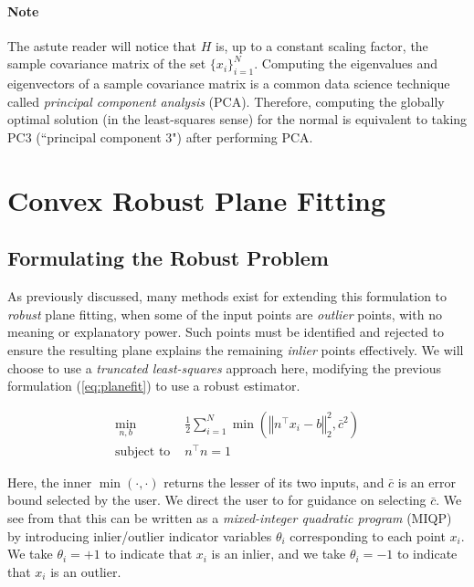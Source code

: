 \documentclass[conference]{IEEEtran}
\begin{document}
\paragraph*{Note} The astute reader will notice that \( H \) is, up to a constant scaling factor, the sample covariance matrix of the set \( \{ x_i \}_{i=1}^N \).  Computing the eigenvalues and eigenvectors of a sample covariance matrix is a common data science technique called \textit{principal component analysis} (PCA).  Therefore, computing the globally optimal solution (in the least-squares sense) for the normal is equivalent to taking PC3 (``principal component 3") after performing PCA.

\section{Convex Robust Plane Fitting}

\subsection{Formulating the Robust Problem}

As previously discussed, many methods exist for extending this formulation to \textit{robust} plane fitting, when some of the input points are \textit{outlier} points, with no meaning or explanatory power.  Such points must be identified and rejected to ensure the resulting plane explains the remaining \textit{inlier} points effectively.  We will choose to use a \textit{truncated least-squares} approach here, modifying the previous formulation (\ref{eq:planefit}) to use a robust estimator.

\begin{align}
	\min_{n, b} \; & \frac12 \sum_{i = 1}^N \min\left( \left\Vert n^\top x_i - b \right\Vert_2^2, \bar{c}^2 \right) \\
	\text{subject to } & n^\top n = 1
	\label{eq:robust}
\end{align}

Here, the inner \( \min(\cdot, \cdot) \) returns the lesser of its two inputs, and \( \bar{c} \) is an error bound selected by the user.  We direct the user to \cite{quasar} for guidance on selecting \( \bar{c} \).  We see from \cite{quasar} that this can be written as a \textit{mixed-integer quadratic program} (MIQP) by introducing inlier/outlier indicator variables \( \theta_i \) corresponding to each point \( x_i \).  We take \( \theta_i = + 1 \) to indicate that \( x_i \) is an inlier, and we take \( \theta_i = -1 \) to indicate that \( x_i \) is an outlier.
\end{document}
